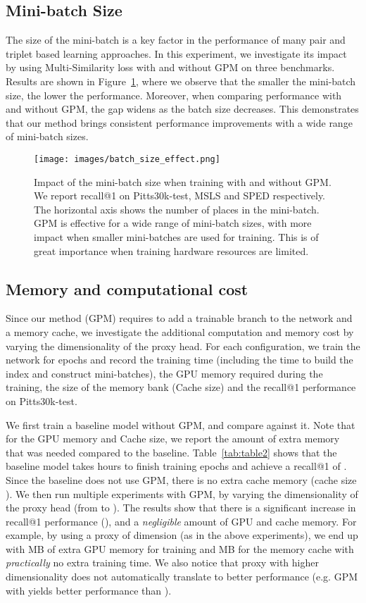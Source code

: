 \documentclass{bmvc2k}
\begin{document}
\subsection{Mini-batch Size}  The size of the mini-batch is a key factor in the performance of many pair and triplet based learning approaches. In this experiment, we investigate its impact by using Multi-Similarity loss with and without GPM on three benchmarks. Results are shown in Figure~\ref{fig:batch_size}, where we observe that the smaller the mini-batch size, the lower the performance.
Moreover, when comparing performance with and without GPM, the gap widens as the batch size decreases. This demonstrates that our method brings consistent performance improvements with a wide range of mini-batch sizes. \begin{figure}[h]
  \centering
  \texttt{[image: images/batch\_size\_effect.png]}
  \vspace{4pt}
  \caption{\small Impact of the mini-batch size when training with and without GPM. We report recall@1 on Pitts30k-test, MSLS and SPED respectively.  The horizontal axis shows  the number of places in the mini-batch. GPM is effective for a wide range of mini-batch sizes, with more impact when smaller mini-batches are used for training. This is of great importance when training hardware resources are limited.}
\label{fig:batch_size}
\end{figure}

\subsection{Memory and computational cost}
Since our method (GPM) requires to add a trainable branch to the network and a memory cache, we investigate the additional computation and memory cost by varying the dimensionality of the proxy head. For each configuration, we train the network for  epochs and record the training time (including the time to build the index and construct mini-batches), the GPU memory required during the training, the size of the memory bank  (Cache size) and the recall@1 performance on Pitts30k-test. 

We first train a baseline model without GPM, and compare against it. Note that for the GPU memory and Cache size, we report the amount of extra memory that was needed compared to the baseline.  
Table~\ref{tab:table2} shows that the baseline model takes  hours to finish  training epochs and achieve a recall@1 of . Since the baseline does not use GPM, there is no extra cache memory (cache size ).
We then run multiple experiments with GPM, by varying the dimensionality  of the proxy head (from  to ). The results show that there is  a significant increase in recall@1 performance (), and a \textit{negligible} amount of GPU and cache memory. For example, by using a proxy of dimension  (as in the above experiments), we end up with MB of extra GPU memory for training  and MB for the memory cache with \textit{practically} no extra training time. We also notice that proxy with higher dimensionality does not automatically translate to better performance (e.g. GPM with  yields better performance than ).
\end{document}
